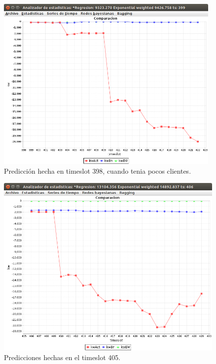 \begin{figure}[ht]
	\centering
	\includegraphics[width=11cm]{img/interrumpibleTimeslot398.png}
	\caption{Predicción hecha en timeslot 398, cuando tenia pocos clientes.}
	\label{fig:interrumpibleTimeslot398}
\end{figure}


\begin{figure}[h]
	\centering
	\includegraphics[width=12cm]{img/interrumpibleTimeslot405.png}
	\caption{Predicciones hechas en el timeslot 405.}
	\label{fig:interrumpibleTimeslot405}
\end{figure}

